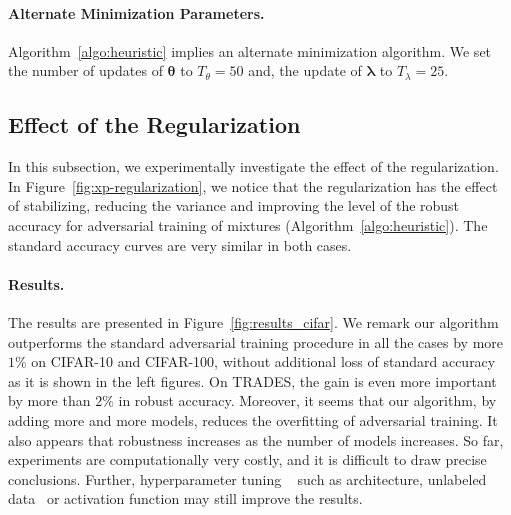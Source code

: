 \paragraph{Alternate Minimization Parameters.} Algorithm~\ref{algo:heuristic} implies an alternate minimization algorithm. We set the number of updates of $\bm{\theta}$ to $T_\theta = 50$ and, the update of $\bm{\lambda}$ to $T_\lambda = 25$. 

\subsection{Effect of the Regularization}
In this subsection, we experimentally investigate the effect of the regularization. In Figure~\ref{fig:xp-regularization}, we notice that the regularization has the effect of stabilizing, reducing the variance and improving the level of the robust accuracy for adversarial training of mixtures (Algorithm~\ref{algo:heuristic}). The standard accuracy curves are very similar in both cases.





\paragraph{Results.} The results are presented in Figure~\ref{fig:results_cifar}. We remark our algorithm outperforms the standard adversarial training procedure in all the cases by more $1\%$ on CIFAR-10 and CIFAR-100, without additional loss of standard accuracy as it is shown in the left figures. On TRADES, the gain is even more important by more than $2\%$ in robust accuracy. Moreover, it seems that our algorithm, by adding more and more models, reduces the overfitting of adversarial training. It also appears that robustness increases as the number of models increases. So far, experiments are computationally very costly, and it is difficult to draw precise conclusions. Further, hyperparameter tuning ~\citep{gowal2020uncovering} such as architecture, unlabeled data~\citep{carmon2019unlabeled} or activation function may still improve the results.








